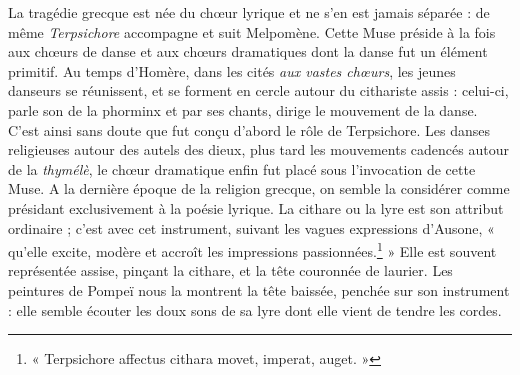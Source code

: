 \documentclass[a4paper, 11pt, oneside, polutonikogreek, french]{article}
\begin{document}
La tragédie grecque est née du chœur lyrique et ne s'en est jamais séparée : de même \emph{Terpsichore} accompagne et suit Melpomène. Cette Muse préside à la fois aux chœurs de danse et aux chœurs dramatiques dont la danse fut un élément primitif. Au temps d'Homère, dans les cités \emph{aux vastes chœurs}, les jeunes danseurs se réunissent, et se forment en cercle autour du cithariste assis : celui-ci, parle son de la phorminx et par ses chants, dirige le mouvement de la danse. C'est ainsi sans doute que fut conçu d'abord le rôle de Terpsichore. Les danses religieuses autour des autels des dieux, plus tard les mouvements cadencés autour de la \emph{thymélè}, le chœur dramatique enfin fut placé sous l'invocation de cette Muse. A la dernière époque de la religion grecque, on semble la considérer comme présidant exclusivement à la poésie lyrique. La cithare ou la lyre est son attribut ordinaire ; c'est avec cet instrument, suivant les vagues expressions d'Ausone, « qu'elle excite, modère et accroît les impressions passionnées.\footnote{« Terpsichore affectus cithara movet, imperat, auget. »} » Elle est souvent représentée assise, pinçant la cithare, et la tête couronnée de laurier. Les peintures de Pompeï nous la montrent la tête baissée, penchée sur son instrument : elle semble écouter les doux sons de sa lyre dont elle vient de tendre les cordes.
\end{document}
